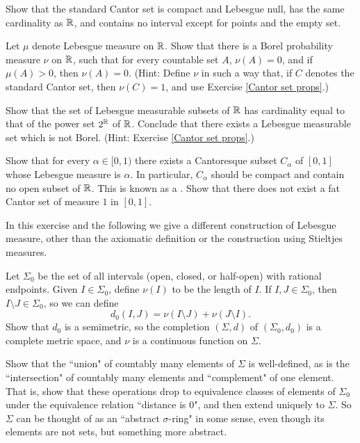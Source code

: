 \begin{exercise}
\label{Cantor set props}
Show that the standard Cantor set is compact and Lebesgue null, has the same cardinality as $\mathbb{R}$, and contains no interval except for points and the empty set.
\end{exercise}

\begin{exercise}
Let $\mu$ denote Lebesgue measure on $\mathbb{R}$.
Show that there is a Borel probability measure $\nu$ on $\mathbb{R}$, such that for every countable set $A$, $\nu(A) = 0$, and if $\mu(A) > 0$, then $\nu(A) = 0$.
(Hint: Define $\nu$ in such a way that, if $C$ denotes the standard Cantor set, then $\nu(C) = 1$, and use Exercise \ref{Cantor set props}.)
\end{exercise}

\begin{exercise}
Show that the set of Lebesgue measurable subsets of $\mathbb{R}$ has cardinality equal to that of the power set $2^{\mathbb{R}}$ of $\mathbb{R}$. Conclude that there exists a Lebesgue measurable set which is not Borel.
(Hint: Exercise \ref{Cantor set props}.)
\end{exercise}

\begin{exercise}
\label{fat cat}
Show that for every $\alpha \in [0, 1)$ there exists a Cantoresque subset $C_\alpha$ of $[0, 1]$ whose Lebesgue measure is $\alpha$.
In particular, $C_\alpha$ should be compact and contain no open subset of $\mathbb{R}$.
This is known as a .
Show that there does not exist a fat Cantor set of measure $1$ in $[0, 1]$.
\end{exercise}

\begin{exercise}
\label{physical lebesgue measure 1}
In this exercise and the following we give a different construction of Lebesgue measure, other than the axiomatic definition or the construction using Stieltjes measures.

Let $\Sigma_0$ be the set of all intervals (open, closed, or half-open) with rational endpoints.
Given $I \in \Sigma_0$, define $\nu(I)$ to be the length of $I$.
If $I, J \in \Sigma_0$, then $I \setminus J \in \Sigma_0$, so we can define
\[d_0(I, J) = \nu(I \setminus J) + \nu(J \setminus I).\]
Show that $d_0$ is a semimetric, so the completion $(\Sigma, d)$ of $(\Sigma_0, d_0)$ is a complete metric space, and $\nu$ is a continuous function on $\Sigma$.

Show that the ``union" of countably many elements of $\Sigma$ is well-defined, as is the ``intersection" of countably many elements and ``complement" of one element.
That is, show that these operations drop to equivalence classes of elements of $\Sigma_0$ under the equivalence relation ``distance is $0$", and then extend uniquely to $\Sigma$.
So $\Sigma$ can be thought of as an ``abstract $\sigma$-ring" in some sense, even though its elements are not sets, but something more abstract.
\end{exercise}

